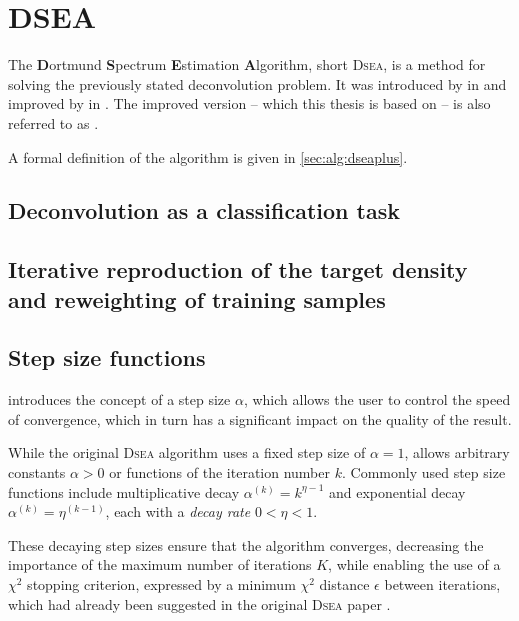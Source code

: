 \section{DSEA} %
The \textbf{D}ortmund \textbf{S}pectrum \textbf{E}stimation \textbf{A}lgorithm,
  short \textsc{Dsea},
is a method for solving the previously stated deconvolution problem.
It was introduced by \citeauthor{dsea_tim} in \citeyear{dsea_tim}
and improved by \citeauthor{dsea_mirko} in \citeyear{dsea_mirko}.
The improved version
  – which this thesis is based on –
is also referred to as \dseaplus.

A formal definition of the \dseaplus algorithm is given in \autoref{sec:alg:dseaplus}.


\subsection{Deconvolution as a classification task} %
\blindtext[2]


\subsection{Iterative reproduction of the target density and reweighting of training samples} %
\blindtext[4]


\subsection{Step size functions} \label{sec:dsea:dsea:stepsize}
\dseaplus introduces the concept of a step size $\alpha$,
which allows the user to control the speed of convergence,
which in turn has a significant impact on the quality of the result.

While the original \textsc{Dsea} algorithm uses a fixed step size of $\alpha = 1$,
\dseaplus allows arbitrary constants $\alpha > 0$
or functions of the iteration number $k$.
Commonly used step size functions include
multiplicative decay
  $\alpha^{(k)} = k^{\eta - 1}$
and exponential decay
  $\alpha^{(k)} = \eta^{(k - 1)}$,
each with a \emph{decay rate} $0 < \eta < 1$.

These decaying step sizes ensure that the algorithm converges,
decreasing the importance of the maximum number of iterations $K$,
while enabling the use of a $\chi^2$ stopping criterion,
  expressed by a minimum $\chi^2$ distance $\epsilon$ between iterations,
  which had already been suggested in the original \textsc{Dsea} paper \cite{dsea_tim}.



